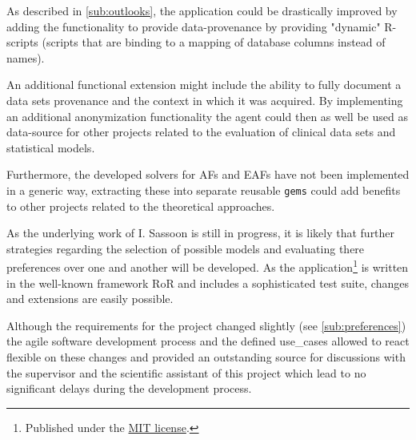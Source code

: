 As described in \autoref{sub:outlooks}, the application could be drastically improved by adding the functionality to provide data-provenance by providing "dynamic" \gls{R}-scripts (scripts that are binding to a mapping of database columns instead of names). 

An additional functional extension might include the ability to fully document a data sets provenance and the context in which it was acquired. By implementing an additional anonymization functionality the agent could then as well be used as data-source for other projects related to the evaluation of clinical data sets and statistical models.

Furthermore, the developed solvers for \glspl{AF} and \glspl{EAF} have not been implemented in a generic way, extracting these into separate reusable \texttt{gems} could add benefits to other projects related to the theoretical approaches.

As the underlying work of I. Sassoon \cite{sassoon2016CD} is still in progress, it is likely that further strategies regarding the selection of possible models and evaluating there preferences over one and another will be developed. As the application\footnote{Published under the \href{https://opensource.org/licenses/MIT}{MIT license}.} is written in the well-known framework \gls{RoR} and includes a sophisticated test suite, changes and extensions are easily possible.
 
Although the requirements for the project changed slightly (see \autoref{sub:preferences}) the agile software development process and the defined \glspl{use_case} allowed to react flexible on these changes and provided an outstanding source for discussions with the supervisor and the scientific assistant of this project which lead to no significant delays during the development process.
\newpage
\newpage
 
